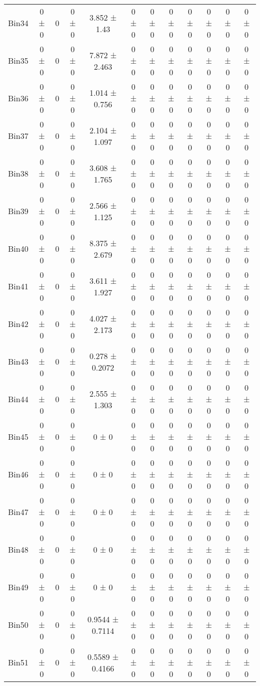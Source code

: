 \begin{tabular}{@{\extracolsep{4pt}}lccccccccccc@{}}
     Bin34 & 0 ± 0 & 0 & 0 ± 0 & 3.852 ± 1.43 & 0 ± 0 & 0 ± 0 & 0 ± 0 & 0 ± 0 & 0 ± 0 & 0 ± 0 & 0 ± 0 \\ 
     Bin35 & 0 ± 0 & 0 & 0 ± 0 & 7.872 ± 2.463 & 0 ± 0 & 0 ± 0 & 0 ± 0 & 0 ± 0 & 0 ± 0 & 0 ± 0 & 0 ± 0 \\ 
     Bin36 & 0 ± 0 & 0 & 0 ± 0 & 1.014 ± 0.756 & 0 ± 0 & 0 ± 0 & 0 ± 0 & 0 ± 0 & 0 ± 0 & 0 ± 0 & 0 ± 0 \\ 
     Bin37 & 0 ± 0 & 0 & 0 ± 0 & 2.104 ± 1.097 & 0 ± 0 & 0 ± 0 & 0 ± 0 & 0 ± 0 & 0 ± 0 & 0 ± 0 & 0 ± 0 \\ 
     Bin38 & 0 ± 0 & 0 & 0 ± 0 & 3.608 ± 1.765 & 0 ± 0 & 0 ± 0 & 0 ± 0 & 0 ± 0 & 0 ± 0 & 0 ± 0 & 0 ± 0 \\ 
     Bin39 & 0 ± 0 & 0 & 0 ± 0 & 2.566 ± 1.125 & 0 ± 0 & 0 ± 0 & 0 ± 0 & 0 ± 0 & 0 ± 0 & 0 ± 0 & 0 ± 0 \\ 
     Bin40 & 0 ± 0 & 0 & 0 ± 0 & 8.375 ± 2.679 & 0 ± 0 & 0 ± 0 & 0 ± 0 & 0 ± 0 & 0 ± 0 & 0 ± 0 & 0 ± 0 \\ 
     Bin41 & 0 ± 0 & 0 & 0 ± 0 & 3.611 ± 1.927 & 0 ± 0 & 0 ± 0 & 0 ± 0 & 0 ± 0 & 0 ± 0 & 0 ± 0 & 0 ± 0 \\ 
     Bin42 & 0 ± 0 & 0 & 0 ± 0 & 4.027 ± 2.173 & 0 ± 0 & 0 ± 0 & 0 ± 0 & 0 ± 0 & 0 ± 0 & 0 ± 0 & 0 ± 0 \\ 
     Bin43 & 0 ± 0 & 0 & 0 ± 0 & 0.278 ± 0.2072 & 0 ± 0 & 0 ± 0 & 0 ± 0 & 0 ± 0 & 0 ± 0 & 0 ± 0 & 0 ± 0 \\ 
     Bin44 & 0 ± 0 & 0 & 0 ± 0 & 2.555 ± 1.303 & 0 ± 0 & 0 ± 0 & 0 ± 0 & 0 ± 0 & 0 ± 0 & 0 ± 0 & 0 ± 0 \\ 
     Bin45 & 0 ± 0 & 0 & 0 ± 0 & 0 ± 0 & 0 ± 0 & 0 ± 0 & 0 ± 0 & 0 ± 0 & 0 ± 0 & 0 ± 0 & 0 ± 0 \\ 
     Bin46 & 0 ± 0 & 0 & 0 ± 0 & 0 ± 0 & 0 ± 0 & 0 ± 0 & 0 ± 0 & 0 ± 0 & 0 ± 0 & 0 ± 0 & 0 ± 0 \\ 
     Bin47 & 0 ± 0 & 0 & 0 ± 0 & 0 ± 0 & 0 ± 0 & 0 ± 0 & 0 ± 0 & 0 ± 0 & 0 ± 0 & 0 ± 0 & 0 ± 0 \\ 
     Bin48 & 0 ± 0 & 0 & 0 ± 0 & 0 ± 0 & 0 ± 0 & 0 ± 0 & 0 ± 0 & 0 ± 0 & 0 ± 0 & 0 ± 0 & 0 ± 0 \\ 
     Bin49 & 0 ± 0 & 0 & 0 ± 0 & 0 ± 0 & 0 ± 0 & 0 ± 0 & 0 ± 0 & 0 ± 0 & 0 ± 0 & 0 ± 0 & 0 ± 0 \\ 
     Bin50 & 0 ± 0 & 0 & 0 ± 0 & 0.9544 ± 0.7114 & 0 ± 0 & 0 ± 0 & 0 ± 0 & 0 ± 0 & 0 ± 0 & 0 ± 0 & 0 ± 0 \\ 
     Bin51 & 0 ± 0 & 0 & 0 ± 0 & 0.5589 ± 0.4166 & 0 ± 0 & 0 ± 0 & 0 ± 0 & 0 ± 0 & 0 ± 0 & 0 ± 0 & 0 ± 0 \\ 

\end{tabular}
